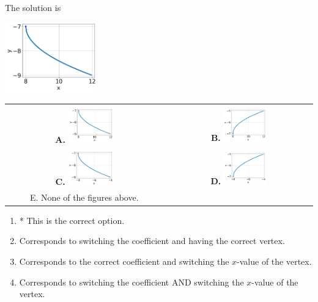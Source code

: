 \documentclass{extbook}[14pt]
\begin{document}
 
 The solution is  
 \begin{center} \includegraphics[width=0.3\textwidth]{../Figures/radicalEquationToGraphCC.png} \end{center}\begin{tabular}{|c|c|} 
\hline 
 & \tabularnewline 
 \textbf{A.} \includegraphics[width=0.3\textwidth]{../Figures/radicalEquationToGraphCC.png} & \textbf{B.} \includegraphics[width=0.3\textwidth]{../Figures/radicalEquationToGraphBC.png} \tabularnewline 
\hline 
 & \tabularnewline 
 \textbf{C.} \includegraphics[width=0.3\textwidth]{../Figures/radicalEquationToGraphDC.png} & \textbf{D.} \includegraphics[width=0.3\textwidth]{../Figures/radicalEquationToGraphAC.png} \tabularnewline 
\hline 
 E. None of the figures above. & \tabularnewline 
\hline 
 \end{tabular} 
 
\begin{enumerate}[label=\Alph*.] 
\item * This is the correct option.  
\item Corresponds to switching the coefficient and having the correct vertex.  
\item Corresponds to the correct coefficient and switching the $x$-value of the vertex.  
\item Corresponds to switching the coefficient AND switching the $x$-value of the vertex.  
\end{enumerate} 
 
\end{document}
